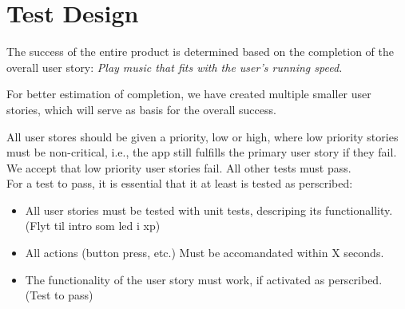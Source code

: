 \section{Test Design}
The success of the entire product is determined based on the completion of the overall user story: \textit{Play music that fits with the user's running speed.}

For better estimation of completion, we have created multiple smaller user stories, which will serve as basis for the overall success.

All user stores should be given a priority, low or high, where low priority stories must be non-critical, i.e., the app still fulfills the primary user story if they fail. We accept that low priority user stories fail. All other tests must pass.\\

\noindent For a test to pass, it is essential that it at least is tested as perscribed:

\begin{itemize}
\item All user stories must be tested with unit tests, descriping its functionallity. (Flyt til intro som led i xp)
\item All actions (button press, etc.) Must be accomandated within X seconds.
\item The functionality of the user story must work, if activated as perscribed. (Test to pass)
\end{itemize}

